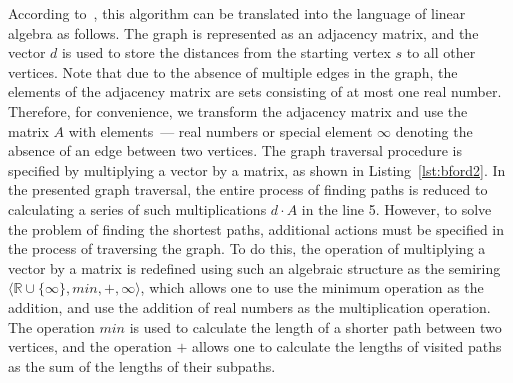 According to~\cite{kepner2011graph}, this algorithm can be translated into the language of linear algebra as follows. The graph is represented as an adjacency matrix, and the vector $d$ is used to store the distances from the starting vertex $s$ to all other vertices. Note that due to the absence of multiple edges in the graph, the elements of the adjacency matrix are sets consisting of at most one real number. Therefore, for convenience, we transform the adjacency matrix and use the matrix $A$ with elements~--- real numbers or special element $\infty$ denoting the absence of an edge between two vertices. The graph traversal procedure is specified by multiplying a vector by a matrix, as shown in Listing~\ref{lst:bford2}. In the presented graph traversal, the entire process of finding paths is reduced to calculating a series of such multiplications $d \cdot A$ in the line 5. However, to solve the problem of finding the shortest paths, additional actions must be specified in the process of traversing the graph. To do this, the operation of multiplying a vector by a matrix is redefined using such an algebraic structure as the semiring $\langle \mathbb{R} \cup \{\infty\}, min, +, \infty \rangle$, which allows one to use the minimum operation as the addition, and use the addition of real numbers as the multiplication operation. The operation $min$ is used to calculate the length of a shorter path between two vertices, and the operation $+$ allows one to calculate the lengths of visited paths as the sum of the lengths of their subpaths.

